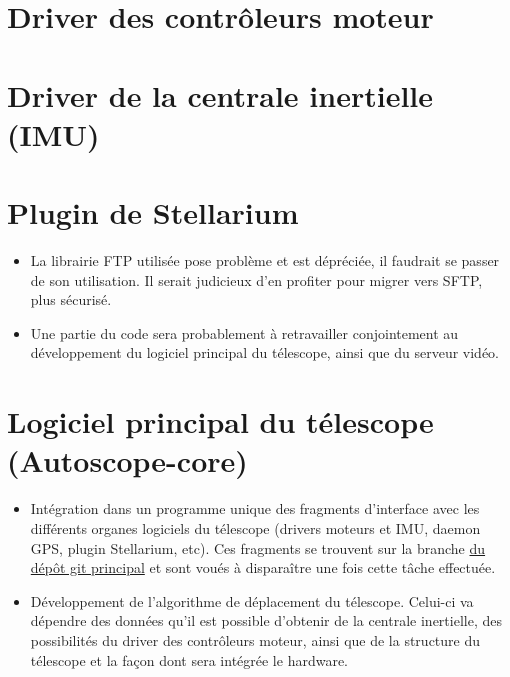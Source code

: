 \section{Driver des contrôleurs moteur}
\section{Driver de la centrale inertielle (IMU)}
\section{Plugin de Stellarium}

\begin{itemize}[label=$\bullet$]
	\item La librairie FTP utilisée  pose problème et est dépréciée, il faudrait se passer de son utilisation. Il serait judicieux d'en profiter pour migrer vers SFTP, plus sécurisé.
	\item Une partie du code sera probablement à retravailler conjointement au développement du logiciel principal du télescope, ainsi que du serveur vidéo.
	\end{itemize}

\section{Logiciel principal du télescope (Autoscope-core)}

\begin{itemize}[label=$\bullet$]
	\item Intégration dans un programme unique des fragments d'interface avec les différents organes logiciels du télescope (drivers moteurs et IMU, daemon GPS, plugin Stellarium, etc). Ces fragments se trouvent sur la branche {\href{https://github.com/thibaudledo/Autoscope/tree/master}{ du dépôt git principal}} et sont voués à disparaître une fois cette tâche effectuée.
	\item Développement de l'algorithme de déplacement du télescope. Celui-ci va dépendre des données qu'il est possible d'obtenir de la centrale inertielle, des possibilités du driver des contrôleurs moteur, ainsi que de la structure du télescope et la façon dont sera intégrée le hardware.
	\end{itemize}

